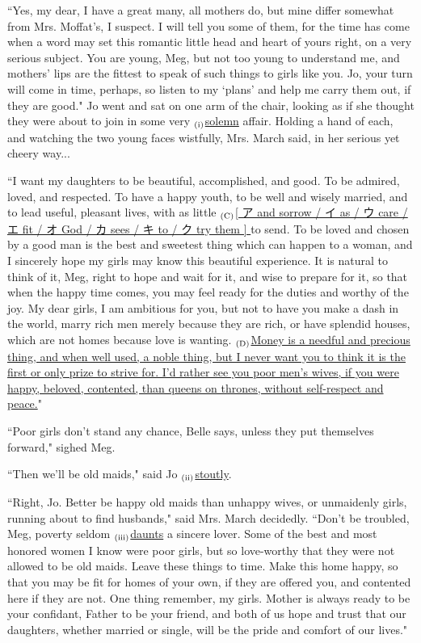 \documentclass[12pt,a4paper,dvipdfmx]{jarticle}
\begin{document}
\begin{spacing}{1.5}
``Yes, my dear, I have a great many, all mothers do, but mine differ somewhat from Mrs. Moffat's, I suspect. I will tell you some of them, for the time has come when a word may set this romantic little head and heart of yours right, on a very serious subject. You are young, Meg, but not too young to understand me, and mothers' lips are the fittest to speak of such things to girls like you. Jo, your turn will come in time, perhaps, so listen to my `plans' and help me carry them out, if they are good."
Jo went and sat on one arm of the chair, looking as if she thought they were about to join in some very $_{\rm(i)}$\ul{solemn} affair. Holding a hand of each, and watching the two young faces wistfully, Mrs. March said, in her serious yet cheery way...

``I want my daughters to be beautiful, accomplished, and good. To be admired, loved, and respected. To have a happy youth, to be well and wisely married, and to lead useful, pleasant lives, with as little $_{\rm(C)}$\ul{[ ア and sorrow / イ as / ウ care / エ fit / オ God / カ sees / キ to / ク try them ] }to send. To be loved and chosen by a good man is the best and sweetest thing which can happen to a woman, and I sincerely hope my girls may know this beautiful experience. It is natural to think of it, Meg, right to hope and wait for it, and wise to prepare for it, so that when the happy time comes, you may feel ready for the duties and worthy of the joy. My dear girls, I am ambitious for you, but not to have you make a dash in the world, marry rich men merely because they are rich, or have splendid houses, which are not homes because love is wanting. $_{\rm(D)}$\ul{Money is a needful and precious thing, and when well used, a noble thing, but I never want you to think it is the first or only prize to strive for. I'd rather see you poor men's wives, if you were happy, beloved, contented, than queens on thrones, without self-respect and peace.}"

``Poor girls don't stand any chance, Belle says, unless they put themselves forward," sighed Meg.

``Then we'll be old maids," said Jo $_{\rm(ii)}$\ul{stoutly}.

``Right, Jo. Better be happy old maids than unhappy wives, or unmaidenly girls, running about to find husbands," said Mrs. March decidedly. ``Don't be troubled, Meg, poverty seldom $_{\rm(iii)}$\ul{daunts} a sincere lover. Some of the best and most honored women I know were poor girls, but so love-worthy that they were not allowed to be old maids. Leave these things to time. Make this home happy, so that you may be fit for homes of your own, if they are offered you, and contented here if they are not. One thing remember, my girls. Mother is always ready to be your confidant, Father to be your friend, and both of us hope and trust that our daughters, whether married or single, will be the pride and comfort of our lives."


\end{spacing}
\end{document}
